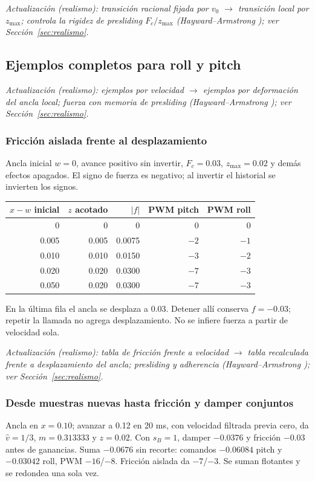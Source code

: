 \textit{Actualización (realismo): transición racional fijada por $v_0$ $\rightarrow$ transición local por $z_{\max}$; controla la rigidez de presliding $F_c/z_{\max}$ (Hayward--Armstrong \cite{hayward2000}); ver Sección~\ref{sec:realismo}.}

\subsection{Ejemplos completos para roll y pitch}

\textit{Actualización (realismo): ejemplos por velocidad $\rightarrow$ ejemplos por deformación del ancla local; fuerza con memoria de presliding (Hayward--Armstrong \cite{hayward2000}); ver Sección~\ref{sec:realismo}.}

\subsubsection{Fricción aislada frente al desplazamiento}
Ancla inicial $w=0$, avance positivo sin invertir, $F_c=0.03$, $z_{\max}=0.02$ y demás efectos apagados. El signo de fuerza es negativo; al invertir el historial se invierten los signos.
\begin{center}\begin{tabular}{rrrrr}
\toprule $x-w$ inicial&$z$ acotado&$|f|$&PWM pitch&PWM roll\\\midrule
0&0&0&0&0\\
0.005&0.005&0.0075&$-2$&$-1$\\
0.010&0.010&0.0150&$-3$&$-2$\\
0.020&0.020&0.0300&$-7$&$-3$\\
0.050&0.020&0.0300&$-7$&$-3$\\
\bottomrule\end{tabular}\end{center}
En la última fila el ancla se desplaza a 0.03. Detener allí conserva $f=-0.03$; repetir la llamada no agrega desplazamiento. No se infiere fuerza a partir de velocidad sola.

\textit{Actualización (realismo): tabla de fricción frente a velocidad $\rightarrow$ tabla recalculada frente a desplazamiento del ancla; presliding y adherencia (Hayward--Armstrong \cite{hayward2000}); ver Sección~\ref{sec:realismo}.}

\subsubsection{Desde muestras nuevas hasta fricción y damper conjuntos}
Ancla en $x=0.10$; avanzar a 0.12 en 20 ms, con velocidad filtrada previa cero, da $\widehat v=1/3$, $m=0.313333$ y $z=0.02$. Con $s_B=1$, damper $-0.0376$ y fricción $-0.03$ antes de ganancias. Suma $-0.0676$ sin recorte: comandos $-0.06084$ pitch y $-0.03042$ roll, PWM $-16$/$-8$. Fricción aislada da $-7$/$-3$. Se suman flotantes y se redondea una sola vez.

